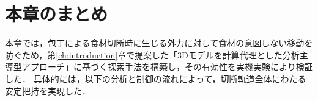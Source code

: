 






\section{本章のまとめ}
\label{sec:holding_summary}

本章では，包丁による食材切断時に生じる外力に対して食材の意図しない移動を防ぐため，第\ref{ch:introduction}章で提案した「3Dモデルを計算代理とした分析主導型アプローチ」に基づく{\nameholdingpointset}探索手法を構築し，その有効性を実機実験により検証した．
具体的には，以下の分析と制御の流れによって，切断軌道全体にわたる安定把持を実現した．

